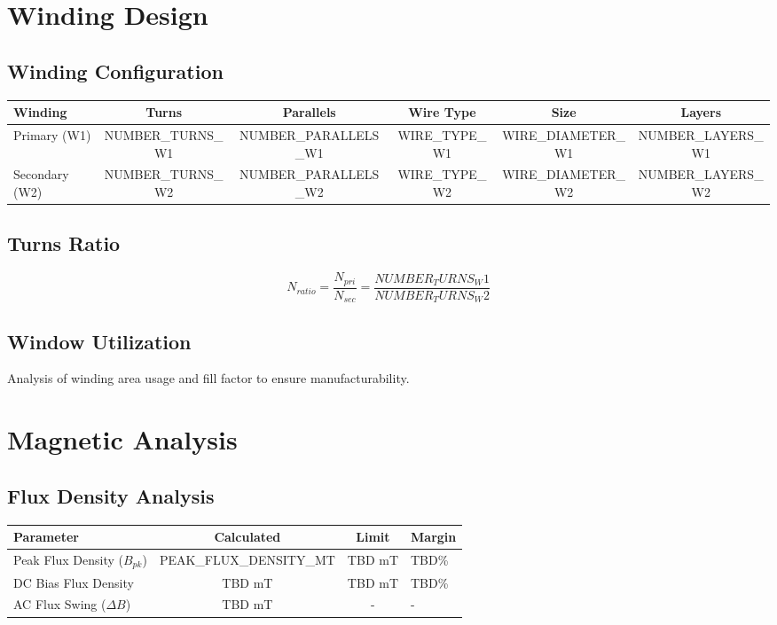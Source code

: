 \documentclass[11pt,a4paper]{article}
\begin{document}
\section{Winding Design}

\subsection{Winding Configuration}
\begin{longtable}{|l|c|c|c|c|c|}
\hline
\textbf{Winding} & \textbf{Turns} & \textbf{Parallels} & \textbf{Wire Type} & \textbf{Size} & \textbf{Layers} \\
\hline
Primary (W1) & {{NUMBER_TURNS_W1}} & {{NUMBER_PARALLELS_W1}} & {{WIRE_TYPE_W1}} & {{WIRE_DIAMETER_W1}} & {{NUMBER_LAYERS_W1}} \\
\hline
Secondary (W2) & {{NUMBER_TURNS_W2}} & {{NUMBER_PARALLELS_W2}} & {{WIRE_TYPE_W2}} & {{WIRE_DIAMETER_W2}} & {{NUMBER_LAYERS_W2}} \\
\hline
\end{longtable}

\subsection{Turns Ratio}
\begin{equation}
N_{ratio} = \frac{N_{pri}}{N_{sec}} = \frac{{{NUMBER_TURNS_W1}}}{{{NUMBER_TURNS_W2}}}
\end{equation}

\subsection{Window Utilization}
Analysis of winding area usage and fill factor to ensure manufacturability.

\section{Magnetic Analysis}
\label{sec:magnetic}

\subsection{Flux Density Analysis}
\begin{longtable}{|l|c|c|l|}
\hline
\textbf{Parameter} & \textbf{Calculated} & \textbf{Limit} & \textbf{Margin} \\
\hline
Peak Flux Density ($B_{pk}$) & {{PEAK_FLUX_DENSITY_MT}} & TBD mT & TBD\% \\
\hline
DC Bias Flux Density & TBD mT & TBD mT & TBD\% \\
\hline
AC Flux Swing ($\Delta B$) & TBD mT & - & - \\
\hline
\end{longtable}
\end{document}
